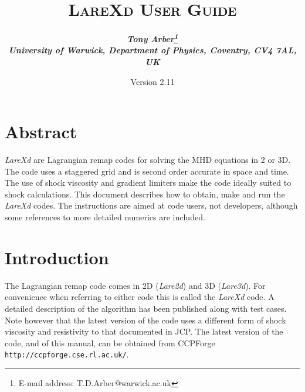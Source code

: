 \documentclass[11pt]{article}
\begin{document}
\title{
\bfseries\scshape LareXd User Guide}
\author{\bfseries\itshape Tony Arber\thanks{E-mail address: T.D.Arber@warwick.ac.uk}\\
University of Warwick, Department of Physics, Coventry, CV4 7AL, UK}
\date{Version 2.11}
\maketitle

\thispagestyle{empty}

\section*{Abstract}
{\it LareXd} are Lagrangian remap codes for solving the MHD equations in 2 or 3D. The code uses a staggered grid and is second order accurate in space and time. The use of shock viscosity and gradient limiters make the code ideally suited to shock calculations. This document describes how to obtain, make and run the {\it LareXd}  codes. The instructions are aimed at code users, not developers, although some references to more detailed numerics are included.


\section{Introduction}
The Lagrangian remap code comes in 2D ({\it Lare2d}) and 3D ({\it Lare3d}). For convenience when referring to either code this is called the {\it LareXd} code. A detailed description of the algorithm has been published \cite{jcp} along with test cases. Note however that the latest version of the code uses a different form of shock viscosity and resistivity to that documented in JCP. The latest version of the code, and of this manual, can be obtained from CCPForge {\tt http://ccpforge.cse.rl.ac.uk/}.
\end{document}
